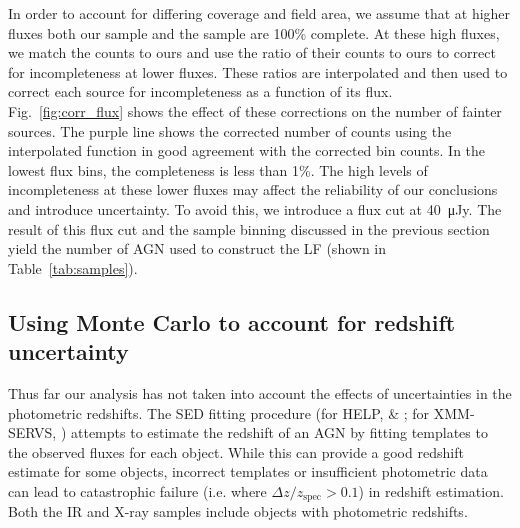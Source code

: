 \documentclass[twocolumn, trackchanges]{aastex63}
\newcommand{\jr}[1]{{\color{purple}[JR: #1]}}
\begin{document}
In order to account for differing coverage and field area, we assume that at higher fluxes both our sample and the \cite{barmby_catalog_2008} sample are 100\% complete.
At these high fluxes, we match the \cite{barmby_catalog_2008} counts to ours and use the ratio of their counts to ours to correct for incompleteness at lower fluxes.
These ratios are interpolated and then used to correct each source for incompleteness as a function of its flux.
Fig.~\ref{fig:corr_flux} shows the effect of these corrections on the number of fainter sources.
The purple line shows the corrected number of counts using the interpolated function in good agreement with the corrected bin counts.
In the lowest flux bins, the completeness is less than 1\%.
The high levels of incompleteness at these lower fluxes may affect the reliability of our conclusions and introduce uncertainty.
To avoid this, we introduce a flux cut at \SI{40}{\micro Jy}.
The result of this flux cut and the sample binning discussed in the previous section yield the number of AGN used to construct the LF (shown in Table~\ref{tab:samples}).

\subsection{Using Monte Carlo to account for redshift uncertainty}
\label{sec:mc}
Thus far our analysis has not taken into account the effects of uncertainties in the photometric redshifts.
The SED fitting procedure (for HELP, \cite{duncanI2018MNRAS.473.2655D} \& \cite{duncanII2018MNRAS.477.5177D}; for XMM-SERVS, \cite{chen_active_2021}) attempts to estimate the redshift of an AGN by fitting templates to the observed fluxes for each object.
While this can provide a good redshift estimate for some objects, incorrect templates or insufficient photometric data can lead to catastrophic failure (i.e. where $\Delta z/z_\mathrm{spec}>0.1$) in redshift estimation.
Both the IR and X-ray samples include objects with photometric redshifts.
\end{document}
